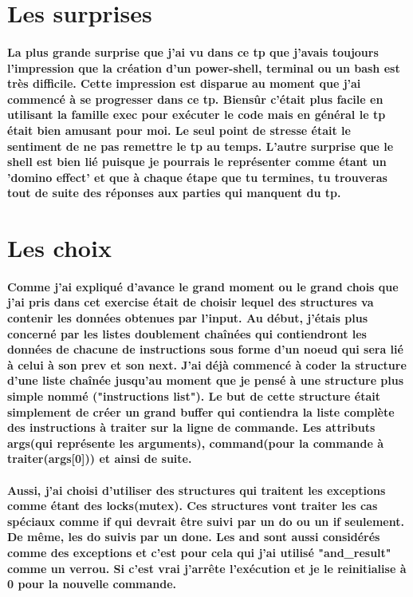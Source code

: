 \documentclass{article}
\begin{document}
\section{Les surprises}
\paragraph{La plus grande surprise que j'ai vu dans ce tp que j'avais toujours l'impression que la création d'un power-shell, terminal ou un bash est très difficile. Cette impression est disparue au moment que j'ai commencé à se progresser dans ce tp. Biensûr c'était plus facile en utilisant la famille exec pour exécuter le code mais en général le tp était bien amusant pour moi. Le seul point de stresse était le sentiment de ne pas remettre le tp au temps. L'autre surprise que le shell est bien lié puisque je pourrais le représenter comme étant un 'domino effect' et que à chaque étape que tu termines, tu trouveras tout de suite des réponses aux parties qui manquent du tp.}


\section{Les choix}
\paragraph{Comme j'ai expliqué d'avance le grand moment ou le grand chois que j'ai pris dans cet exercise était de choisir lequel des structures va contenir les données obtenues par l'input. Au début, j'étais plus concerné par les listes doublement chaînées qui contiendront les données de chacune de instructions sous forme d'un noeud qui sera lié à celui à son prev et son next. J'ai déjà commencé à coder la structure d'une liste chaînée jusqu'au moment que je pensé à une structure plus simple nommé ("instructions list"). Le but de cette structure était simplement de créer un grand buffer qui contiendra la liste complète des instructions à traiter sur la ligne de commande. Les attributs args(qui représente les arguments), command(pour la commande à traiter(args[0])) et ainsi de suite.}

\paragraph{Aussi, j'ai choisi d'utiliser des structures qui traitent les exceptions comme étant des locks(mutex). Ces structures vont traiter les cas spéciaux comme if qui devrait être suivi par un do ou un if seulement. De même, les do suivis par un done. Les and sont aussi considérés comme des exceptions et c'est pour cela qui j'ai utilisé "and\_result" comme un verrou. Si c'est vrai j'arrête l'exécution et je le reinitialise à 0 pour la nouvelle commande.}
\end{document}
